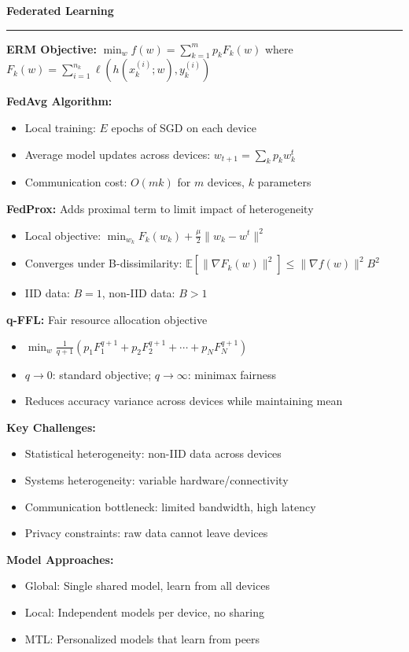 \documentclass[8pt,letter,landscape]{article}
\newcommand{\sectiontitle}[1]{\textbf{\large #1}\vspace{0.2em}\hrule\vspace{0.5em}}
\begin{document}
\begin{multicols*}{3}
\sectiontitle{Federated Learning}

\textbf{ERM Objective:} $\min_w f(w) = \sum_{k=1}^m p_k F_k(w)$ where $F_k(w) = \sum_{i=1}^{n_k} \ell(h(x_k^{(i)}; w), y_k^{(i)})$

\textbf{FedAvg Algorithm:}
\begin{itemize}[leftmargin=*,nosep]
    \item Local training: $E$ epochs of SGD on each device
    \item Average model updates across devices: $w_{t+1} = \sum_{k} p_k w_k^t$
    \item Communication cost: $O(mk)$ for $m$ devices, $k$ parameters
\end{itemize}

\textbf{FedProx:} Adds proximal term to limit impact of heterogeneity
\begin{itemize}[leftmargin=*,nosep]
    \item Local objective: $\min_{w_k} F_k(w_k) + \frac{\mu}{2} \|w_k - w^t\|^2$
    \item Converges under B-dissimilarity: $\mathbb{E}[\|\nabla F_k(w)\|^2] \leq \|\nabla f(w)\|^2B^2$
    \item IID data: $B=1$, non-IID data: $B>1$
\end{itemize}

\textbf{q-FFL:} Fair resource allocation objective
\begin{itemize}[leftmargin=*,nosep]
    \item $\min_w \frac{1}{q+1}(p_1F_1^{q+1} + p_2F_2^{q+1} + \cdots + p_NF_N^{q+1})$
    \item $q \to 0$: standard objective; $q \to \infty$: minimax fairness
    \item Reduces accuracy variance across devices while maintaining mean
\end{itemize}

\textbf{Key Challenges:}
\begin{itemize}[leftmargin=*,nosep]
    \item Statistical heterogeneity: non-IID data across devices
    \item Systems heterogeneity: variable hardware/connectivity
    \item Communication bottleneck: limited bandwidth, high latency
    \item Privacy constraints: raw data cannot leave devices
\end{itemize}

\textbf{Model Approaches:}
\begin{itemize}[leftmargin=*,nosep]
    \item Global: Single shared model, learn from all devices
    \item Local: Independent models per device, no sharing
    \item MTL: Personalized models that learn from peers
\end{itemize}


\end{multicols*}
\end{document}

